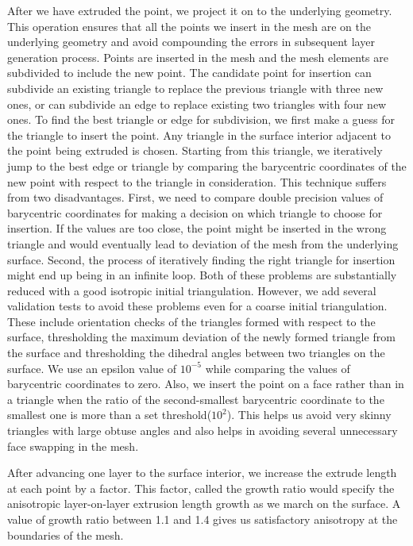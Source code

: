 \documentclass[conf]{new-aiaa}
\begin{document}
After we have extruded the point, we project it on to the underlying geometry. This operation ensures that all the  points we insert in the mesh are on the underlying geometry and avoid compounding the errors in subsequent layer generation process. Points are inserted in the mesh and the mesh elements are subdivided to include the new point. The candidate point for insertion can subdivide an existing triangle to replace the previous triangle with three new ones, or can subdivide an edge to replace existing two triangles with four new ones. To find the best triangle or edge for subdivision, we first make a guess for the triangle to insert the point. Any triangle in the surface interior adjacent to the point being extruded is chosen. Starting from this triangle, we iteratively jump to the best edge or triangle by comparing the barycentric coordinates of the new point with respect to the triangle in consideration. This technique suffers from two disadvantages. First, we need to compare double precision values of barycentric coordinates for making a decision on which triangle to choose for insertion. If the values are too close, the point might be inserted in the wrong triangle and would eventually lead to deviation of the mesh from the underlying surface. Second, the process of iteratively finding the right triangle for insertion might end up being in an infinite loop. Both of these problems are substantially reduced with a good isotropic initial triangulation. However, we add several validation tests to avoid these problems even for a coarse initial triangulation. These include orientation checks of the triangles formed with respect to the surface, thresholding the maximum deviation of the newly formed triangle from the surface and thresholding the dihedral angles between two triangles on the surface. We use an epsilon value of $10^{-5}$ while comparing the values of barycentric coordinates to zero. Also, we insert the point on a face rather than in a triangle when the ratio of the second-smallest barycentric coordinate to the smallest one is more than a set threshold($10^2$). This helps us avoid very skinny triangles with large obtuse angles and also helps in avoiding several unnecessary face swapping in the mesh.

After advancing one layer to the surface interior, we increase the extrude length at each point by a factor. This factor, called the growth ratio would specify the anisotropic layer-on-layer extrusion length growth as we march on the surface. A value of growth ratio between 1.1 and 1.4 gives us satisfactory anisotropy at the boundaries of the mesh.
\end{document}
